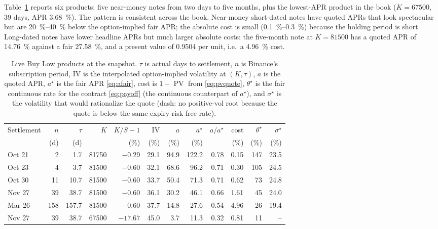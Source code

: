 \documentclass[11pt]{article}
\newcommand{\PV}{\operatorname{PV}}
\begin{document}
Table~\ref{tab:cases} reports six products: five near-money notes from two days to five months, plus the lowest-APR product in the book ($K=\num{67500}$, 39 days, APR \SI{3.68}{\percent}). The pattern is consistent across the book. Near-money short-dated notes have quoted APRs that look spectacular but are \SI{20}{\percent}--\SI{40}{\percent} below the option-implied fair APR; the absolute cost is small (\SI{0.1}{\percent}--\SI{0.3}{\percent}) because the holding period is short. Long-dated notes have lower headline APRs but much larger absolute costs: the five-month note at $K=\num{81500}$ has a quoted APR of \SI{14.76}{\percent} against a fair \SI{27.58}{\percent}, and a present value of \num{0.9504} per unit, i.e.\ a \SI{4.96}{\percent} cost.

\begin{table}[t]
\centering
\caption{Live Buy Low products at the snapshot. $\tau$ is actual days to settlement, $n$ is Binance's subscription period, IV is the interpolated option-implied volatility at $(K,\tau)$, $a$ is the quoted APR, $a^\star$ is the fair APR \eqref{eq:afair}, cost is $1-\PV$ from \eqref{eq:pvquote}, $\theta^\star$ is the fair continuous rate for the contract \eqref{eq:payoff} (the continuous counterpart of $a^\star$), and $\sigma^\star$ is the volatility that would rationalize the quote (dash: no positive-vol root because the quote is below the same-expiry risk-free rate).}
\label{tab:cases}
\small
\begin{tabular}{lrrrrrrrrrrr}
\toprule
Settlement & $n$ & $\tau$ & $K$ & $K/S-1$ & IV & $a$ & $a^\star$ & $a/a^\star$ & cost & $\theta^\star$ & $\sigma^\star$\\
 & (d) & (d) & & (\%) & (\%) & (\%) & (\%) & & (\%) & (\%) & (\%)\\
\midrule
Oct 21 & 2 & 1.7 & \num{81750} & $-0.29$ & 29.1 & 94.9 & 122.2 & 0.78 & 0.15 & 147 & 23.5\\
Oct 23 & 4 & 3.7 & \num{81500} & $-0.60$ & 32.1 & 68.6 & 96.2 & 0.71 & 0.30 & 105 & 24.5\\
Oct 30 & 11 & 10.7 & \num{81500} & $-0.60$ & 33.7 & 50.4 & 71.3 & 0.71 & 0.62 & 73 & 24.8\\
Nov 27 & 39 & 38.7 & \num{81500} & $-0.60$ & 36.1 & 30.2 & 46.1 & 0.66 & 1.61 & 45 & 24.0\\
Mar 26 & 158 & 157.7 & \num{81500} & $-0.60$ & 37.7 & 14.8 & 27.6 & 0.54 & 4.96 & 26 & 19.4\\
Nov 27 & 39 & 38.7 & \num{67500} & $-17.67$ & 45.0 & 3.7 & 11.3 & 0.32 & 0.81 & 11 & --\\
\bottomrule
\end{tabular}
\end{table}
\end{document}
